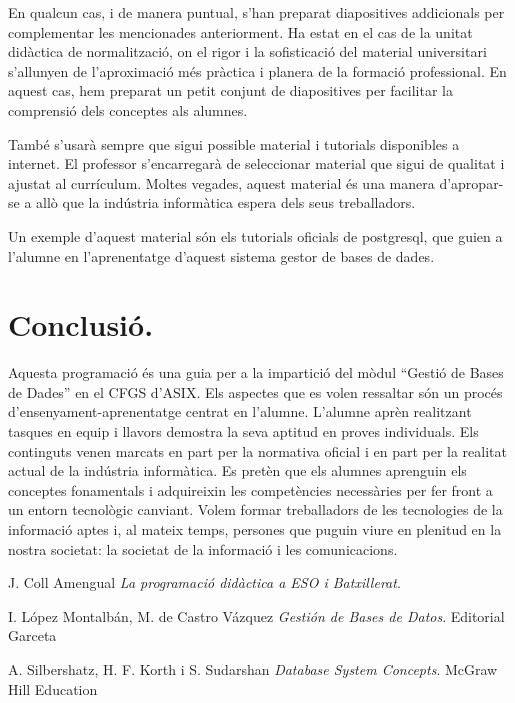 \documentclass[catalan, a4paper, 12pt, titlepage]{article}
\begin{document}
En qualcun cas, i de manera puntual, s'han preparat diapositives addicionals per complementar les mencionades anteriorment.
Ha estat en el cas de la unitat didàctica de normalització, on el rigor i la sofisticació del material universitari s'allunyen de l'aproximació més pràctica i planera de la formació professional.
En aquest cas, hem preparat un petit conjunt de diapositives per facilitar la comprensió dels conceptes als alumnes.

També s'usarà sempre que sigui possible material i tutorials disponibles a internet. 
El professor s'encarregarà de seleccionar material que sigui de qualitat i ajustat al currículum.
Moltes vegades, aquest material és una manera d'apropar-se a allò que la indústria informàtica espera dels seus treballadors.

Un exemple d'aquest material són els tutorials oficials de postgresql, que guien a l'alumne en l'aprenentatge d'aquest sistema gestor de bases de dades.

\section{Conclusió.}
\label{sec:conclusió}

Aquesta programació és una guia per a la impartició del mòdul ``Gestió de Bases de Dades'' en el CFGS d'ASIX.
Els aspectes que es volen ressaltar són un procés d'ensenyament-aprenentatge centrat en l'alumne.
L'alumne aprèn realitzant tasques en equip i llavors demostra la seva aptitud en proves individuals.
Els continguts venen marcats en part per la normativa oficial i en part per la realitat actual de la indústria informàtica.
Es pretèn que els alumnes aprenguin els conceptes fonamentals i adquireixin les competències necessàries per fer front a un entorn tecnològic canviant.
Volem formar treballadors de les tecnologies de la informació aptes i, al mateix temps, persones que puguin viure en plenitud en la nostra societat:
la societat de la informació i les comunicacions.



\begin{thebibliography}{9}

J. Coll Amengual
\textit{La programació didàctica a ESO i Batxillerat}. 

I. López Montalbán, M. de Castro Vázquez
\textit{Gestión de Bases de Datos}. 
Editorial Garceta

A. Silbershatz, H. F. Korth i S. Sudarshan 
\textit{Database System Concepts}. 
McGraw Hill Education

\end{thebibliography}
\end{document}
